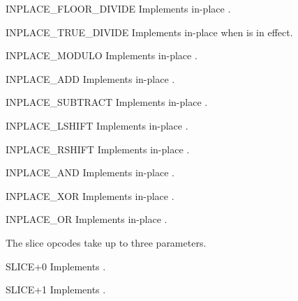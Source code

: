 \begin{opcodedesc}{INPLACE_FLOOR_DIVIDE}{}
Implements in-place .
\end{opcodedesc}

\begin{opcodedesc}{INPLACE_TRUE_DIVIDE}{}
Implements in-place  when
 is in effect.
\end{opcodedesc}

\begin{opcodedesc}{INPLACE_MODULO}{}
Implements in-place .
\end{opcodedesc}

\begin{opcodedesc}{INPLACE_ADD}{}
Implements in-place .
\end{opcodedesc}

\begin{opcodedesc}{INPLACE_SUBTRACT}{}
Implements in-place .
\end{opcodedesc}

\begin{opcodedesc}{INPLACE_LSHIFT}{}
Implements in-place .
\end{opcodedesc}

\begin{opcodedesc}{INPLACE_RSHIFT}{}
Implements in-place .
\end{opcodedesc}

\begin{opcodedesc}{INPLACE_AND}{}
Implements in-place .
\end{opcodedesc}

\begin{opcodedesc}{INPLACE_XOR}{}
Implements in-place .
\end{opcodedesc}

\begin{opcodedesc}{INPLACE_OR}{}
Implements in-place .
\end{opcodedesc}

The slice opcodes take up to three parameters.

\begin{opcodedesc}{SLICE+0}{}
Implements .
\end{opcodedesc}

\begin{opcodedesc}{SLICE+1}{}
Implements .
\end{opcodedesc}

